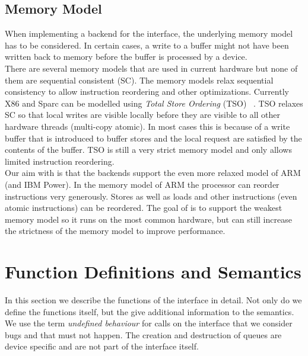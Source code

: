 \documentclass[a4paper,11pt,twoside]{report}
\begin{document}
	\section{Memory Model}
	When implementing a backend for the \devif interface, the underlying memory model 
	has to be considered. In certain cases, a write to a buffer might not have been written back
	to memory before the buffer is processed by a device. 
	\\
	There are several memory models that are used in current hardware but none of them 
	are sequential consistent (SC). The memory models relax sequential consistency to allow 
	instruction reordering and other optimizations. Currently X86 and Sparc can be 
	modelled using \textit{Total Store Ordering} (TSO) ~\cite{swell:cacm2010}. TSO relaxes 
	SC so that local writes are visible locally before they are visible to all other
	hardware threads (multi-copy atomic). In most cases this is because of a write buffer
	that is introduced to buffer stores and the local request are satisfied by the contents 
	of the buffer. TSO is still a very strict memory model and only allows limited instruction
	reordering. 
	\\
	Our aim with \devif is that the backends support the even more relaxed model of ARM 
	\cite{swell:cacm2016,arm:mm} (and IBM Power). In the memory model of ARM the processor can 
	reorder instructions very generously. Stores as well as loads and other instructions 
	(even atomic instructions) can be reordered. The goal of \devif is to support the weakest memory
	model so it runs on the most common hardware, but can still increase the strictness
	of the memory model to improve performance. 
	

	\chapter{Function Definitions and Semantics}
	In this section we describe the functions of the \devif interface in detail. 
	Not only do we define the functions itself, 
	but the give additional information to the semantics. We use the term 
	\textit{undefined behaviour} for calls on the interface that we consider
	bugs and that must not happen. The creation and destruction of queues 
	are device specific and are not part of the interface itself. 
	
\end{document}

